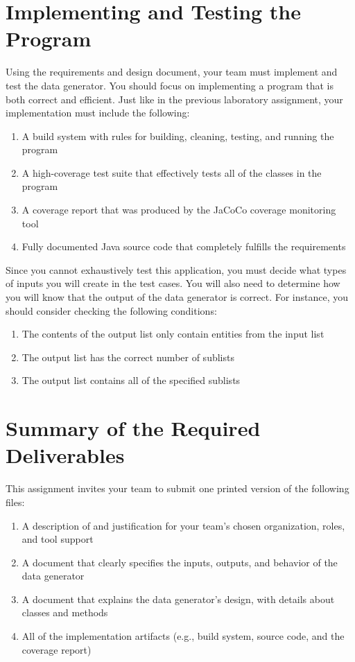 \section*{Implementing and Testing the Program}

Using the requirements and design document, your team must implement and test the data generator. You should focus on
implementing a program that is both correct and efficient. Just like in the previous laboratory assignment, your
implementation must include the following:

\begin{enumerate}
	\item A build system with rules for building, cleaning, testing, and running the program
	\item A high-coverage test suite that effectively tests all of the classes in the program
	\item A coverage report that was produced by the JaCoCo coverage monitoring tool
	\item Fully documented Java source code that completely fulfills the requirements
\end{enumerate}

Since you cannot exhaustively test this application, you must decide what types of inputs you will create in the test
cases.  You will also need to determine how you will know that the output of the data generator is correct.  For
instance, you should consider checking the following conditions:

\begin{enumerate}
	\item The contents of the output list only contain entities from the input list
	\item The output list has the correct number of sublists
	\item The output list contains all of the specified sublists
\end{enumerate}

\section*{Summary of the Required Deliverables}

This assignment invites your team to submit one printed version of the following files:

\begin{enumerate}
	
	\item A description of and justification for your team's chosen organization, roles, and tool support
	\item A document that clearly specifies the inputs, outputs, and behavior of the data generator
	\item A document that explains the data generator's design, with details about classes and methods
	\item All of the implementation artifacts (e.g., build system, source code, and the coverage report) 

\end{enumerate}

